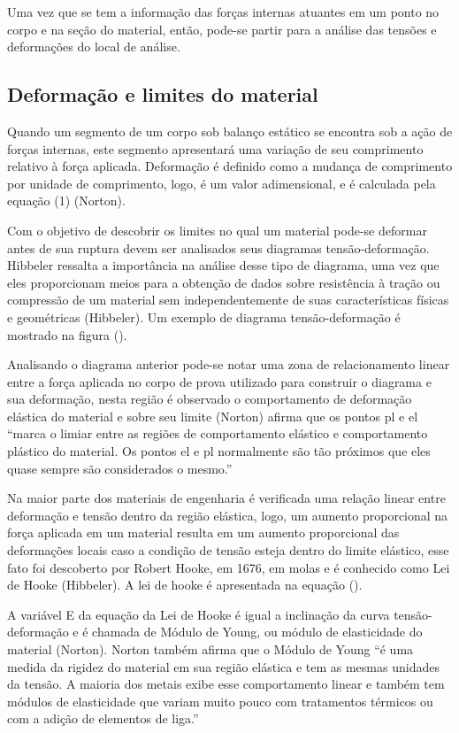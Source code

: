 Uma vez que se tem a informação das forças internas atuantes em um ponto no corpo e na seção do material, então, pode-se partir para a análise das tensões e deformações do local de análise.

\subsection{Deformação e limites do material}

Quando um segmento de um corpo sob balanço estático se encontra sob a ação de forças internas, este segmento apresentará uma variação de seu comprimento relativo à força aplicada. Deformação é definido como a mudança de comprimento por unidade de comprimento, logo, é um valor adimensional, e é calculada pela equação (1) (Norton).

Com o objetivo de descobrir os limites no qual um material pode-se deformar antes de sua ruptura devem ser analisados seus diagramas tensão-deformação. Hibbeler ressalta a importância na análise desse tipo de diagrama, uma vez que eles proporcionam meios para a obtenção de dados sobre resistência à tração ou compressão de um material sem independentemente de suas características físicas e geométricas (Hibbeler). Um exemplo de diagrama tensão-deformação é mostrado na figura ().

Analisando o diagrama anterior pode-se notar uma zona de relacionamento linear entre a força aplicada no corpo de prova utilizado para construir o diagrama e sua deformação, nesta região é observado o comportamento de deformação elástica do material e sobre seu limite (Norton) afirma que os pontos pl e el “marca o limiar entre as regiões de comportamento elástico e comportamento plástico do material. Os pontos el e pl normalmente são tão próximos que eles quase sempre são considerados o mesmo.”

Na maior parte dos materiais de engenharia é verificada uma relação linear entre deformação e tensão dentro da região elástica, logo, um aumento proporcional na força aplicada em um material resulta em um aumento proporcional das deformações locais caso a condição de tensão esteja dentro do limite elástico, esse fato foi descoberto por Robert Hooke, em 1676, em molas e é conhecido como Lei de Hooke (Hibbeler). A lei de hooke é apresentada na equação ().

A variável E da equação da Lei de Hooke é igual a inclinação da curva tensão-deformação e é chamada de Módulo de Young, ou módulo de elasticidade do material (Norton). Norton também afirma que o Módulo de Young “é uma medida da rigidez do material em sua região elástica e tem as mesmas unidades da tensão. A maioria dos metais exibe esse comportamento linear e também tem módulos de elasticidade que variam muito pouco com tratamentos térmicos ou com a adição de elementos de liga.”

